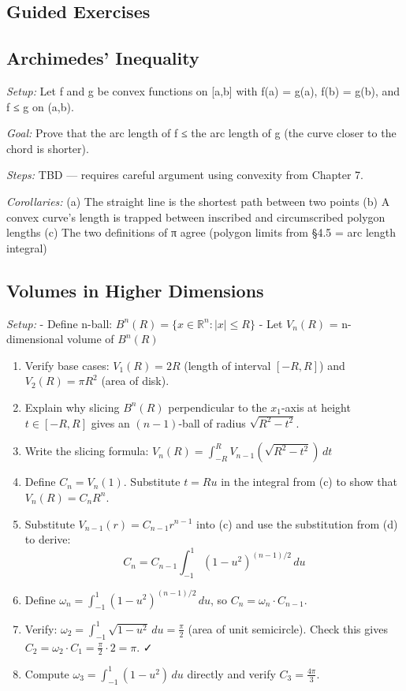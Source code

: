 \documentclass[
  10pt,
  letterpaper,
]{scrbook}
\begin{document}
\subsection{Guided Exercises}\label{guided-exercises-17}

\subsection{Archimedes' Inequality}\label{archimedes-inequality-1}

\emph{Setup:} Let f and g be convex functions on {[}a,b{]} with f(a) =
g(a), f(b) = g(b), and f ≤ g on (a,b).

\emph{Goal:} Prove that the arc length of f ≤ the arc length of g (the
curve closer to the chord is shorter).

\emph{Steps:} TBD --- requires careful argument using convexity from
Chapter 7.

\emph{Corollaries:} (a) The straight line is the shortest path between
two points (b) A convex curve's length is trapped between inscribed and
circumscribed polygon lengths (c) The two definitions of π agree
(polygon limits from §4.5 = arc length integral)

\subsection{Volumes in Higher
Dimensions}\label{volumes-in-higher-dimensions}

\emph{Setup:} - Define n-ball:
\(B^n(R) = \{x \in \mathbb{R}^n : |x| \leq R\}\) - Let \(V_n(R)\) =
n-dimensional volume of \(B^n(R)\)

\begin{enumerate}
\def\labelenumi{(\alph{enumi})}
\item
  Verify base cases: \(V_1(R) = 2R\) (length of interval \([-R, R]\))
  and \(V_2(R) = \pi R^2\) (area of disk).
\item
  Explain why slicing \(B^n(R)\) perpendicular to the \(x_1\)-axis at
  height \(t \in [-R, R]\) gives an \((n-1)\)-ball of radius
  \(\sqrt{R^2 - t^2}\).
\item
  Write the slicing formula:
  \(V_n(R) = \int_{-R}^{R} V_{n-1}(\sqrt{R^2 - t^2}) \, dt\)
\item
  Define \(C_n = V_n(1)\). Substitute \(t = Ru\) in the integral from
  (c) to show that \(V_n(R) = C_n R^n\).
\item
  Substitute \(V_{n-1}(r) = C_{n-1} r^{n-1}\) into (c) and use the
  substitution from (d) to derive:
  \[C_n = C_{n-1} \int_{-1}^{1} (1 - u^2)^{(n-1)/2} \, du\]
\item
  Define \(\omega_n = \int_{-1}^{1} (1 - u^2)^{(n-1)/2} \, du\), so
  \(C_n = \omega_n \cdot C_{n-1}\).
\item
  Verify:
  \(\omega_2 = \int_{-1}^{1} \sqrt{1-u^2} \, du = \frac{\pi}{2}\) (area
  of unit semicircle). Check this gives
  \(C_2 = \omega_2 \cdot C_1 = \frac{\pi}{2} \cdot 2 = \pi\). ✓
\item
  Compute \(\omega_3 = \int_{-1}^{1} (1-u^2) \, du\) directly and verify
  \(C_3 = \frac{4\pi}{3}\).
\end{enumerate}
\end{document}
